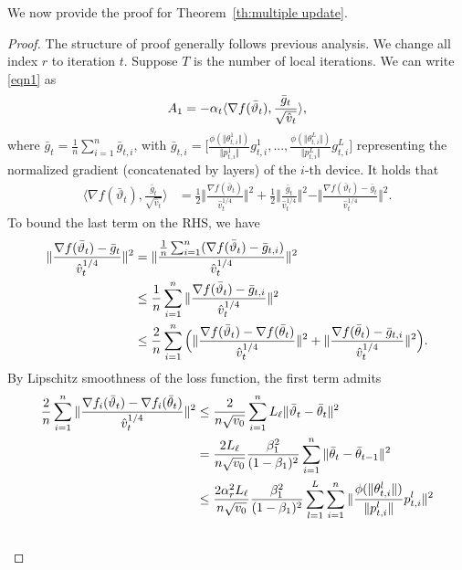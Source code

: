 \documentclass{article}
\begin{document}
We now provide the proof for Theorem~\ref{th:multiple update}.
\begin{proof}
The structure of proof generally follows previous analysis. We change all index $r$ to iteration $t$. Suppose $T$ is the number of local iterations. We can write \eqref{eqn1} as
\begin{align}\notag
    A_1=-\alpha_t \langle \nabla f(\bar \vartheta_t),\frac{\bar g_t}{\sqrt{\hat v_t}} \rangle,
\end{align}
where $\bar g_t=\frac{1}{n}\sum_{i=1}^n \bar g_{t,i}$, with $\bar g_{t,i}=\Big[\frac{\phi(\Vert \theta_{t,i}^1\Vert)}{\Vert p_{t,i}^1\Vert}g_{t,i}^1,..., \frac{\phi(\Vert \theta_{t,i}^L\Vert)}{\Vert p_{t,i}^L\Vert}g_{t,i}^L   \Big]$ representing the normalized gradient (concatenated by layers) of the $i$-th device. It holds that
\begin{align}
    \langle \nabla f(\bar \vartheta_t),\frac{\bar g_t}{\sqrt{\hat v_t}} \rangle&=\frac{1}{2}\Vert \frac{\nabla f(\bar\vartheta_t) }{\hat v_t^{1/4}}\Vert^2+\frac{1}{2}\Vert \frac{\bar g_t }{\hat v_t^{1/4}}\Vert^2-\Vert \frac{\nabla f(\bar\vartheta_t)-\bar g_t }{\hat v_t^{1/4}}\Vert^2.  \label{eqn:x1}
\end{align}
To bound the last term on the RHS, we have
\begin{align}\notag
    \Vert \frac{\nabla f(\bar\vartheta_t)-\bar g_t }{\hat v_t^{1/4}}\Vert^2&=\Vert \frac{\frac{1}{n}\sum_{i=1}^n (\nabla f(\bar\vartheta_t)-\bar g_{t,i})}{\hat v_t^{1/4}} \Vert^2\\\notag
    &\leq \frac{1}{n}\sum_{i=1}^n\Vert \frac{\nabla f(\bar\vartheta_t)-\bar g_{t,i}}{\hat v_t^{1/4}} \Vert^2\\\notag
    &\leq \frac{2}{n}\sum_{i=1}^n \Big(\Vert \frac{\nabla f(\bar\vartheta_t)-\nabla f(\bar\theta_t)}{\hat v_t^{1/4}} \Vert^2+\Vert \frac{\nabla f(\bar\theta_t)-\bar g_{t,i}}{\hat v_t^{1/4}} \Vert^2  \Big). 
\end{align}
By Lipschitz smoothness of the loss function, the first term admits
\begin{align}\notag
    \frac{2}{n}\sum_{i=1}^n\Vert \frac{\nabla f_i(\bar\vartheta_t)-\nabla f_i(\bar\theta_t)}{\hat v_t^{1/4}} \Vert^2&\leq \frac{2}{n \sqrt{v_0}}\sum_{i=1}^n L_\ell\Vert \bar\vartheta_t-\bar\theta_t\Vert^2  \\\notag
    &=\frac{2L_\ell}{n \sqrt{v_0}}\frac{\beta_1^2}{(1-\beta_1)^2}\sum_{i=1}^n \Vert \bar\theta_t-\bar\theta_{t-1}\Vert ^2\\\notag
    &\leq \frac{2\alpha_r^2 L_\ell }{n \sqrt{v_0}}\frac{\beta_1^2}{(1-\beta_1)^2} \sum_{l=1}^L \sum_{i=1}^n\Vert \frac{\phi(\Vert \theta_{t,i}^l\Vert)}{\Vert p_{t,i}^l\Vert}p_{t,i}^l \Vert^2\\\notag

\end{align}
\end{proof}
\end{document}

